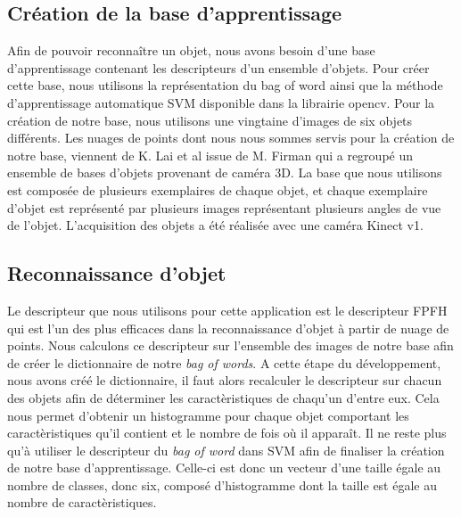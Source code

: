 \subsection{Création de la base d'apprentissage}
Afin de pouvoir reconnaître un objet, nous avons besoin d'une base d'apprentissage contenant les descripteurs d'un ensemble
d'objets. Pour créer cette base, nous utilisons la représentation du \og bag of word \fg ainsi que la méthode d'apprentissage 
automatique SVM\cite{SVM} disponible dans la librairie opencv. Pour la création de notre base, nous utilisons une vingtaine
d'images de six objets différents. Les nuages de points dont nous nous sommes servis pour la création de notre base, viennent de 
K. Lai et al\cite{Base1} issue de M. Firman\cite{generalBase} qui a regroupé un ensemble de bases d'objets provenant de caméra 3D.
La base que nous utilisons est composée de plusieurs exemplaires de chaque objet, et chaque exemplaire d'objet est représenté par 
plusieurs images représentant plusieurs angles de vue de l'objet. L'acquisition des objets a été réalisée avec une caméra 
Kinect v1.\\


\subsection{Reconnaissance d'objet}
Le descripteur que nous utilisons pour cette application est le descripteur FPFH\cite{FPFH} qui est l'un des plus efficaces dans la
reconnaissance d'objet à partir de nuage de points. Nous calculons ce descripteur sur l'ensemble des images de notre base afin de
créer le dictionnaire de notre \textit{bag of words}. A cette étape du développement, nous avons créé le dictionnaire, il faut
alors recalculer le descripteur sur chacun des objets afin de déterminer les caractèristiques de chaqu'un d'entre eux. Cela nous
permet d'obtenir un histogramme pour chaque objet comportant les caractèristiques qu'il contient et le nombre de fois où il
apparaît. Il ne reste plus qu'à utiliser le descripteur du \textit{bag of word} dans SVM afin de finaliser la création de 
notre base d'apprentissage. Celle-ci est donc un vecteur d'une taille égale au nombre de classes, donc six, 
composé d'histogramme dont la taille est égale au nombre de caractèristiques.\\

